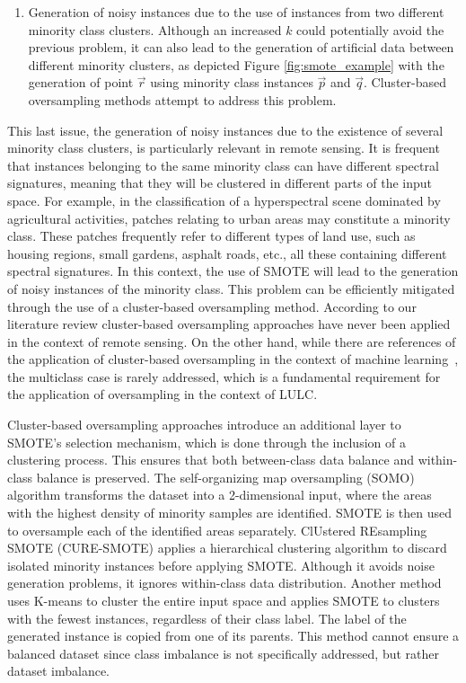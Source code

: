 \documentclass[authoryear,preprint,12pt]{elsarticle}
\begin{document}
\begin{linenumbers}
\begin{enumerate}
    \item Generation of noisy instances due to the use of
        instances from two different minority class clusters.
        Although an increased $k$ could potentially avoid the previous
        problem, it can also lead to the generation of artificial data between
        different minority clusters, as depicted Figure
        \ref{fig:smote_example} with the generation of point
        $\overrightarrow{r}$ using minority class instances $\overrightarrow{p}$ and $\overrightarrow{q}$.
        Cluster-based oversampling methods attempt to address this problem. 
\end{enumerate}

This last issue, the generation of noisy instances due to the existence of
several minority class clusters, is particularly relevant in remote sensing.
It is frequent that instances belonging to the same minority class can have
different spectral signatures, meaning that they will be clustered in
different parts of the input space. For example, in the classification of a
hyperspectral scene dominated by agricultural activities, patches relating to
urban areas may constitute a minority class. These patches frequently refer to
different types of land use, such as housing regions, small gardens, asphalt
roads, etc., all these containing different spectral signatures. In this
context, the use of SMOTE will lead to the generation of noisy instances of
the minority class. This problem can be efficiently mitigated through the use
of a cluster-based oversampling method. According to our literature review
cluster-based oversampling approaches have never been applied in the context
of remote sensing. On the other hand, while there are references of the
application of cluster-based oversampling in the context of machine
learning~\citep{Santos2015, Douzas2017, Ma2017, Douzas2018}, the multiclass
case is rarely addressed, which is a fundamental requirement for the
application of oversampling in the context of LULC. 

Cluster-based oversampling approaches introduce an additional layer to SMOTE's
selection mechanism, which is done through the inclusion of a clustering
process. This ensures that both between-class data balance and
within-class balance is preserved. The
self-organizing map oversampling (SOMO) \citep{Douzas2017} algorithm transforms
the dataset into a 2-dimensional input, where the areas with the highest
density of minority samples are identified. SMOTE is then used to oversample
each of the identified areas separately. ClUstered REsampling SMOTE
(CURE-SMOTE) \citep{Ma2017} applies a hierarchical clustering
algorithm to discard isolated minority instances before applying SMOTE.
Although it avoids noise generation problems, it ignores within-class data
distribution. Another method \citep{Santos2015} uses K-means to cluster the
entire input space and applies SMOTE to clusters with the fewest
instances, regardless of their class label. The label of the
generated instance is copied from one of its parents.
This method cannot ensure a balanced dataset since class imbalance is not
specifically addressed, but rather dataset imbalance.


\end{linenumbers}
\end{document}
